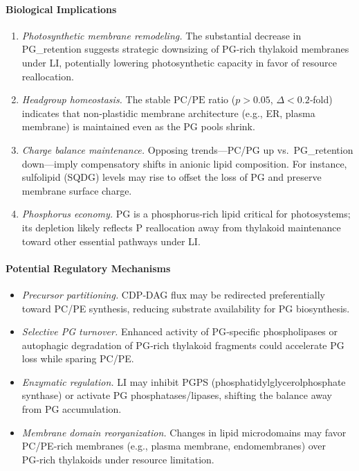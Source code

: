 \documentclass[10pt,letterpaper]{article}
\begin{document}
\paragraph{Biological Implications}
\begin{enumerate}
  \item \textit{Photosynthetic membrane remodeling.}  
        The substantial decrease in PG\_retention suggests strategic downsizing of PG‑rich thylakoid membranes under LI, potentially lowering photosynthetic capacity in favor of resource reallocation.
  \item \textit{Headgroup homeostasis.}  
        The stable \(\mathrm{PC/PE}\) ratio (\(p>0.05\), \(\Delta<0.2\)‑fold) indicates that non‑plastidic membrane architecture (e.g., ER, plasma membrane) is maintained even as the PG pools shrink.
  \item \textit{Charge balance maintenance.}  
        Opposing trends—PC/PG up vs.\ PG\_retention down—imply compensatory shifts in anionic lipid composition. For instance, sulfolipid (SQDG) levels may rise to offset the loss of PG and preserve membrane surface charge.
  \item \textit{Phosphorus economy.}  
        PG is a phosphorus‑rich lipid critical for photosystems; its depletion likely reflects P reallocation away from thylakoid maintenance toward other essential pathways under LI.
\end{enumerate}

\paragraph{Potential Regulatory Mechanisms}
\begin{itemize}
  \item \textit{Precursor partitioning.}  
        CDP‑DAG flux may be redirected preferentially toward PC/PE synthesis, reducing substrate availability for PG biosynthesis.
  \item \textit{Selective PG turnover.}  
        Enhanced activity of PG‑specific phospholipases or autophagic degradation of PG‑rich thylakoid fragments could accelerate PG loss while sparing PC/PE.
  \item \textit{Enzymatic regulation.}  
        LI may inhibit PGPS (phosphatidylglycerolphosphate synthase) or activate PG phosphatases/lipases, shifting the balance away from PG accumulation.
  \item \textit{Membrane domain reorganization.}  
        Changes in lipid microdomains may favor PC/PE‑rich membranes (e.g., plasma membrane, endomembranes) over PG‑rich thylakoids under resource limitation.
\end{itemize}
\end{document}
